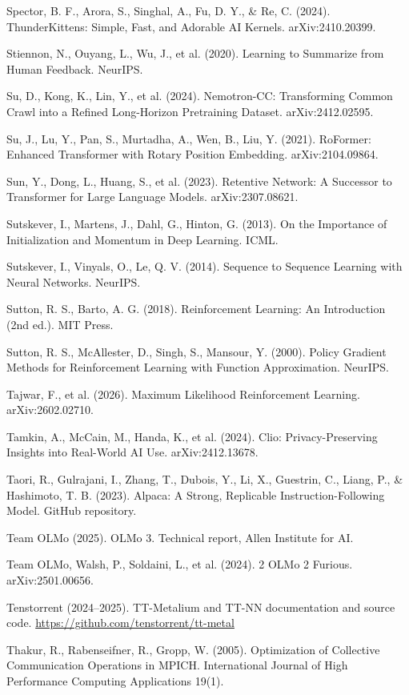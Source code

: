 {\begin{enumerate}[leftmargin=*,itemsep=1pt,label={[\arabic*]}]
\item Spector, B. F., Arora, S., Singhal, A., Fu, D. Y., \& Re, C. (2024). ThunderKittens: Simple, Fast, and Adorable AI Kernels. arXiv:2410.20399.
\item Stiennon, N., Ouyang, L., Wu, J., et al. (2020). Learning to Summarize from Human Feedback. NeurIPS.
\item Su, D., Kong, K., Lin, Y., et al. (2024). Nemotron-CC: Transforming Common Crawl into a Refined Long-Horizon Pretraining Dataset. arXiv:2412.02595.
\item Su, J., Lu, Y., Pan, S., Murtadha, A., Wen, B., Liu, Y. (2021). RoFormer: Enhanced Transformer with Rotary Position Embedding. arXiv:2104.09864.
\item Sun, Y., Dong, L., Huang, S., et al. (2023). Retentive Network: A Successor to Transformer for Large Language Models. arXiv:2307.08621.
\item Sutskever, I., Martens, J., Dahl, G., Hinton, G. (2013). On the Importance of Initialization and Momentum in Deep Learning. ICML.
\item Sutskever, I., Vinyals, O., Le, Q. V. (2014). Sequence to Sequence Learning with Neural Networks. NeurIPS.
\item Sutton, R. S., Barto, A. G. (2018). Reinforcement Learning: An Introduction (2nd ed.). MIT Press.
\item Sutton, R. S., McAllester, D., Singh, S., Mansour, Y. (2000). Policy Gradient Methods for Reinforcement Learning with Function Approximation. NeurIPS.
\item Tajwar, F., et al. (2026). Maximum Likelihood Reinforcement Learning. arXiv:2602.02710.
\item Tamkin, A., McCain, M., Handa, K., et al. (2024). Clio: Privacy-Preserving Insights into Real-World AI Use. arXiv:2412.13678.
\item Taori, R., Gulrajani, I., Zhang, T., Dubois, Y., Li, X., Guestrin, C., Liang, P., \& Hashimoto, T. B. (2023). Alpaca: A Strong, Replicable Instruction-Following Model. GitHub repository.
\item Team OLMo (2025). OLMo 3. Technical report, Allen Institute for AI.
\item Team OLMo, Walsh, P., Soldaini, L., et al. (2024). 2 OLMo 2 Furious. arXiv:2501.00656.
\item Tenstorrent (2024--2025). TT-Metalium and TT-NN documentation and source code. \url{https://github.com/tenstorrent/tt-metal}
\item Thakur, R., Rabenseifner, R., Gropp, W. (2005). Optimization of Collective Communication Operations in MPICH. International Journal of High Performance Computing Applications 19(1).

\end{enumerate}}
